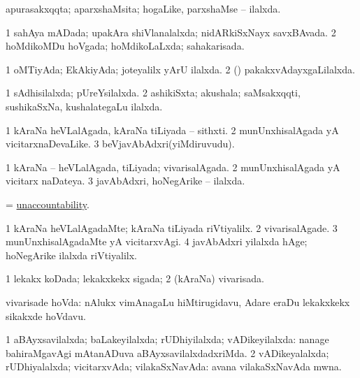 \bentry
{} 
\gl{\gu}
\expl{}
\bmng
apurasakxqqta; aparxshaMsita; hogaLike, parxshaMse -- ilalxda. 
\emng
\eentry

\bentry
{} 
\gl{\gu}
\expl{}
\bmng
\bnum
\num{1} sahAya mADada; upakAra shiVlanalalxda; nidARkiSxNayx savxBAvada. 
\num{2} hoMdikoMDu hoVgada; hoMdikoLaLxda; sahakarisada. 
\enum
\emng
\eentry

\bentry
{} 
\gl{\gu}
\expl{}
\bmng
\bnum
\num{1} oMTiyAda; EkAkiyAda; joteyalilx yArU ilalxda. 
\num{2} (\saM) pakakxvAdayxgaLilalxda. 
\enum
\emng
\eentry

\bentry
{} 
\gl{\gu}
\expl{}
\bmng
\bnum
\num{1} sAdhisilalxda; pUreYsilalxda. 
\num{2} ashikiSxta; akushala; saMsakxqqti, sushikaSxNa, kushalategaLu ilalxda. 
\enum
\emng
\eentry

\bentry
{} 
\gl{\nA}
\expl{}
\bmng
\bnum
\num{1} kAraNa heVLalAgada, kAraNa tiLiyada -- sithxti. 
\num{2} munUnxhisalAgada yA vicitarxnaDevaLike. 
\num{3} beVjavAbAdxri(yiMdiruvudu). 
\enum
\emng
\eentry

\bentry
{} 
\gl{\gu}
\expl{}
\bmng
\bnum
\num{1} kAraNa -- heVLalAgada, tiLiyada; vivarisalAgada. 
\num{2} munUnxhisalAgada yA vicitarx naDateya. 
\num{3} javAbAdxri, hoNegArike -- ilalxda. 
\enum
\emng
\eentry

\bentry
{} 
\bmng
= \hyperlink{unaccountability}{unaccountability}. 
\emng
\eentry

\bentry
{} 
\gl{\kirxvi}
\expl{}
\bmng
\bnum
\num{1} kAraNa heVLalAgadaMte; kAraNa tiLiyada riVtiyalilx. 
\num{2} vivarisalAgade. 
\num{3} munUnxhisalAgadaMte yA vicitarxvAgi. 
\num{4} javAbAdxri yilalxda hAge; hoNegArike ilalxda riVtiyalilx. 
\enum
\emng
\eentry

\bentry
{} 
\gl{\gu}
\expl{}
\bmng
\bnum
\num{1} lekakx koDada; lekakxkekx sigada; 
\num{2} (kAraNa) vivarisada. 
\enum
\emng

\noindent
\gl{\pagu}
\expl{}
\bmng
{} vivarisade hoVda:  nAlukx vimAnagaLu hiMtirugidavu, Adare eraDu lekakxkekx sikakxde hoVdavu. 
\emng
\eentry

\bentry
{} 
\gl{\gu}
\expl{}
\bmng
\bnum
\num{1} aBAyxsavilalxda; baLakeyilalxda; rUDhiyilalxda; vADikeyilalxda:  nanage bahiraMgavAgi mAtanADuva aBAyxsavilalxdadxriMda. 
\num{2} vADikeyalalxda; rUDhiyalalxda; vicitarxvAda; vilakaSxNavAda:  avana vilakaSxNavAda mwna. 
\enum
\emng
\eentry

